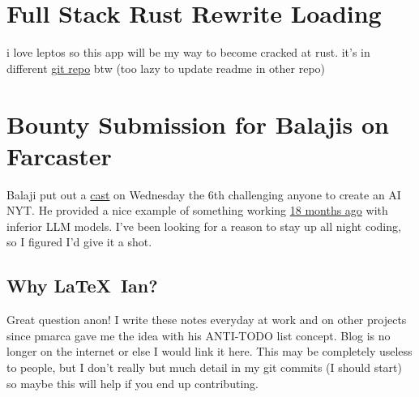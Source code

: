 \newpage
\section{Full Stack Rust Rewrite Loading}
i love leptos so this app will be my way to become cracked at rust. it's in
different 
\textcolor{blue}{\href{https://github.com/iturner72/thenetworktimes}{git repo}}
btw (too lazy to update readme in other repo)

\newpage
\section{Bounty Submission for Balajis on Farcaster}

Balaji put out a
\textcolor{purple}{\href{https://warpcast.com/balajis.eth/0x218b92a7}{cast}} on
Wednesday the 6th challenging anyone to create an AI NYT. He provided a nice
example of something working
\textcolor{blue}{\href{https://twitter.com/balajis/status/1601398685106991105?s=46}{18
months ago}} with inferior LLM models. I've been looking for a reason to stay up
all night coding, so I figured I'd give it a shot.


\subsection*{Why \LaTeX\ Ian?}
Great question anon! I write these notes everyday at work and on other projects
since pmarca gave me the idea with his ANTI-TODO list concept. Blog is no longer
on the internet or else I would link it here. This may be completely useless to
people, but I don't really but much detail in my git commits (I should start) so
maybe this will help if you end up contributing.
